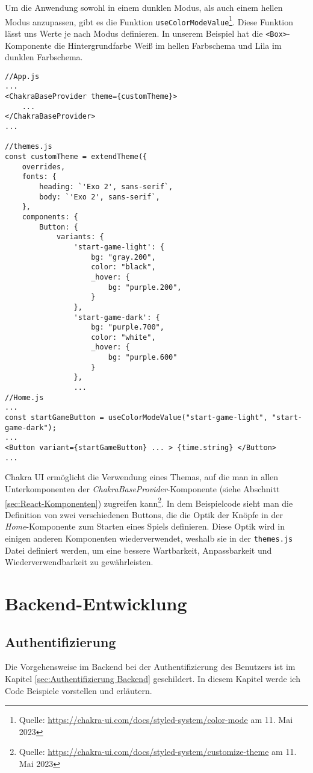 Um die Anwendung sowohl in einem dunklen Modus, als auch einem hellen Modus anzupassen, gibt es die Funktion \verb|useColorModeValue|\footnote{Quelle: \url{https://chakra-ui.com/docs/styled-system/color-mode} am 11. Mai 2023}. Diese Funktion lässt uns Werte je nach Modus definieren. In unserem Beispiel hat die \verb|<Box>|-Komponente die Hintergrundfarbe Weiß im hellen Farbschema und Lila im dunklen Farbschema.

\begin{lstlisting}[style=codeStyle, caption={Verwendung von einem Thema mit Chakra UI}, label={lst:themes.js}]
//App.js
...
<ChakraBaseProvider theme={customTheme}>
    ...
</ChakraBaseProvider>
...

//themes.js
const customTheme = extendTheme({
    overrides,
    fonts: {
        heading: `'Exo 2', sans-serif`,
        body: `'Exo 2', sans-serif`,
    },
    components: {
        Button: {
            variants: {
                'start-game-light': {
                    bg: "gray.200",
                    color: "black",
                    _hover: {
                        bg: "purple.200",
                    }
                },
                'start-game-dark': {
                    bg: "purple.700",
                    color: "white",
                    _hover: {
                        bg: "purple.600"
                    }
                },
                ...
//Home.js
...
const startGameButton = useColorModeValue("start-game-light", "start-game-dark");
...
<Button variant={startGameButton} ... > {time.string} </Button>
...
\end{lstlisting}

Chakra UI ermöglicht die Verwendung eines Themas, auf die man in allen Unterkomponenten der \textit{ChakraBaseProvider}-Komponente (siehe Abschnitt \ref{sec:React-Komponenten}) zugreifen kann\footnote{Quelle: \url{https://chakra-ui.com/docs/styled-system/customize-theme} am 11. Mai 2023}. In dem Beispielcode sieht man die Definition von zwei verschiedenen Buttons, die die Optik der Knöpfe in der \textit{Home}-Komponente zum Starten eines Spiels definieren. Diese Optik wird in einigen anderen Komponenten wiederverwendet, weshalb sie in der \verb|themes.js| Datei definiert werden, um eine bessere Wartbarkeit, Anpassbarkeit und Wiederverwendbarkeit zu gewährleisten.


    \section{Backend-Entwicklung}
    \subsection{Authentifizierung}
    \label{sec:Backend-auth-impl}
Die Vorgehensweise im Backend bei der Authentifizierung des Benutzers ist im Kapitel \ref{sec:Authentifizierung Backend} geschildert. In diesem Kapitel werde ich Code Beispiele vorstellen und erläutern.

